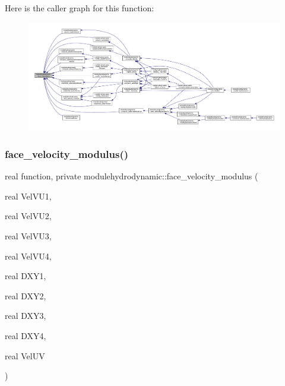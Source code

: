 Here is the caller graph for this function\+:\nopagebreak
\begin{figure}[H]
\begin{center}
\leavevmode
\includegraphics[width=350pt]{namespacemodulehydrodynamic_aeaeab24d9e7539d66950b61105ead64f_icgraph}
\end{center}
\end{figure}
\mbox{\label{namespacemodulehydrodynamic_a59e16bb385ccdef967139d17eb850973}} 
\subsubsection{\texorpdfstring{face\+\_\+velocity\+\_\+modulus()}{face\_velocity\_modulus()}}
{\footnotesize\ttfamily real function, private modulehydrodynamic\+::face\+\_\+velocity\+\_\+modulus (\begin{DoxyParamCaption}\item[{real}]{Vel\+V\+U1,  }\item[{real}]{Vel\+V\+U2,  }\item[{real}]{Vel\+V\+U3,  }\item[{real}]{Vel\+V\+U4,  }\item[{real}]{D\+X\+Y1,  }\item[{real}]{D\+X\+Y2,  }\item[{real}]{D\+X\+Y3,  }\item[{real}]{D\+X\+Y4,  }\item[{real}]{Vel\+UV }\end{DoxyParamCaption})\hspace{0.3cm}{\ttfamily [private]}}

